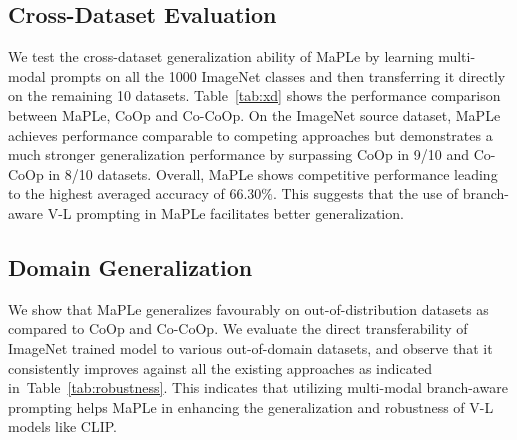\documentclass[10pt,twocolumn,letterpaper]{article}
\newcommand{\tableCellHeight}{1}
\newcommand{\tabstyle}[1]{
  \setlength{\tabcolsep}{#1}
  \renewcommand{\arraystretch}{\tableCellHeight}
  \centering
  \small
}
\begin{document}
\begin{SCtable*}[][!h]
    \tabstyle{4pt}
        \caption{ Comparison of MaPLe with existing approaches on cross-dataset evaluation. Overall, MaPLe achieves competitive performance providing highest average accuracy, indicating better generalization.
    }
    \label{tab:xd}
\end{SCtable*}



\subsection{Cross-Dataset Evaluation}
\noindent We test the cross-dataset generalization ability of MaPLe by learning multi-modal prompts on all the 1000 ImageNet classes and then transferring it directly on the remaining 10 datasets. Table~\ref{tab:xd} shows the performance comparison between MaPLe, CoOp and Co-CoOp. On the ImageNet source dataset, MaPLe achieves performance comparable to competing approaches but demonstrates a much stronger generalization performance by surpassing CoOp in 9/10 and Co-CoOp in 8/10 datasets. Overall, MaPLe shows competitive performance leading to the highest averaged accuracy of 66.30\%. This suggests that the use of branch-aware V-L prompting in MaPLe facilitates better generalization.
\subsection{Domain Generalization}
\vspace{-0.1in}
\noindent We show that MaPLe generalizes favourably on out-of-distribution datasets as compared to CoOp and Co-CoOp. We evaluate the direct transferability of ImageNet trained model to various out-of-domain datasets, and observe that it consistently improves against all the existing approaches as indicated in~Table~\ref{tab:robustness}. This indicates that utilizing multi-modal branch-aware prompting helps MaPLe in enhancing the generalization and robustness of V-L models like CLIP.
\end{document}
